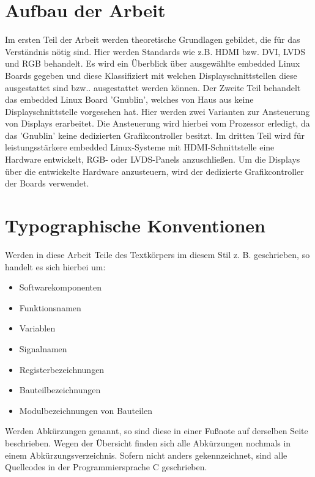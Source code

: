 \section{Aufbau der Arbeit}
Im ersten Teil der Arbeit werden theoretische Grundlagen gebildet, die für das Verständnis nötig sind. Hier werden Standards wie z.B. HDMI bzw. DVI, LVDS und RGB behandelt. Es wird ein Überblick über ausgewählte embedded Linux Boards gegeben und diese Klassifiziert mit welchen Displayschnittstellen diese ausgestattet sind bzw.. ausgestattet werden können.
Der Zweite Teil behandelt das embedded Linux Board 'Gnublin', welches von Haus aus keine Displayschnittstelle vorgesehen hat. Hier werden zwei Varianten zur Ansteuerung von Displays erarbeitet. Die Ansteuerung wird hierbei vom Prozessor erledigt, da das 'Gnublin' keine dedizierten Grafikcontroller besitzt.
Im dritten Teil wird für leistungsstärkere embedded Linux-Systeme mit HDMI-Schnittstelle eine Hardware entwickelt, RGB- oder LVDS-Panels anzuschließen. Um die Displays über die entwickelte Hardware anzusteuern, wird der dedizierte Grafikcontroller der Boards verwendet.

\section{Typographische Konventionen}
Werden in diese Arbeit Teile des Textkörpers im diesem Stil z. B.  geschrieben, so handelt es sich hierbei um:
\begin{itemize}
\item Softwarekomponenten
\item Funktionsnamen
\item Variablen
\item Signalnamen
\item Registerbezeichnungen
\item Bauteilbezeichnungen
\item Modulbezeichnungen von Bauteilen
\end{itemize}
Werden Abkürzungen genannt, so sind diese in einer Fußnote auf derselben Seite beschrieben. Wegen der Übersicht finden sich alle Abkürzungen nochmals in einem Abkürzungsverzeichnis.
Sofern nicht anders gekennzeichnet, sind alle Quellcodes in der Programmiersprache C geschrieben.
